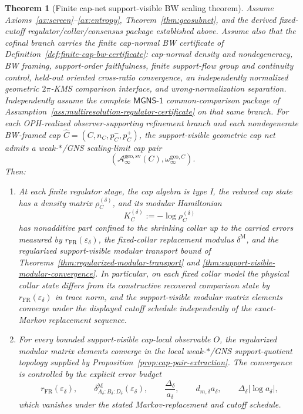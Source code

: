 \documentclass[11pt]{article}
\newtheorem{theorem}{Theorem}[section]
\begin{document}
\begin{theorem}[Finite cap-net support-visible BW scaling theorem]\label{thm:bw}
Assume Axioms~\ref{ax:screen}--\ref{ax:entropy}, Theorem~\ref{thm:geosubnet}, and the derived fixed-cutoff regulator/collar/consensus package established above. Assume also that the cofinal branch carries the finite cap-normal BW certificate of Definition~\ref{def:finite-cap-bw-certificate}: cap-normal density and nondegeneracy, BW framing, support-order faithfulness, finite support-flow group and continuity control, held-out oriented cross-ratio convergence, an independently normalized geometric \(2\pi\)-KMS comparison interface, and wrong-normalization separation. Independently assume the complete \(\mathsf{MGNS\text{-}1}\) common-comparison package of Assumption~\ref{ass:multiresolution-regulator-certificate} on that same branch. For each OPH-realized observer-supporting refinement branch and each nondegenerate BW-framed cap \(\widehat C=(C,n_C,p_C^-,p_C^+)\), the support-visible geometric cap net admits a weak-\(*\)/GNS scaling-limit cap pair
\[
(\mathcal A_\infty^{\mathrm{geo,sv}}(C),\omega_\infty^{\mathrm{geo},C}).
\]
Then:
\begin{enumerate}[label=\textup{(\roman*)},leftmargin=2em]
\item At each finite regulator stage, the cap algebra is type I, the reduced cap state has a density matrix \(\rho_C^{(\delta)}\), and its modular Hamiltonian
\[
K_C^{(\delta)}:=-\log \rho_C^{(\delta)}
\]
has nonadditive part confined to the shrinking collar up to the carried errors measured by \(r_{\mathrm{FR}}(\varepsilon_\delta)\), the fixed-collar replacement modulus \(\delta^{\mathrm M}\), and the regularized support-visible modular transport bound of Theorems~\ref{thm:regularized-modular-transport} and \ref{thm:support-visible-modular-convergence}. In particular, on each fixed collar model the physical collar state differs from its constructive recovered comparison state by \(r_{\mathrm{FR}}(\varepsilon_\delta)\) in trace norm, and the support-visible modular matrix elements converge under the displayed cutoff schedule independently of the exact-Markov replacement sequence.

\item For every bounded support-visible cap-local observable \(O\), the regularized modular
matrix elements converge in the local weak-\(*\)/GNS support-quotient topology supplied by
Proposition~\ref{prop:cap-pair-extraction}. The convergence is controlled by the explicit error
budget
\[
r_{\mathrm{FR}}(\varepsilon_\delta),\qquad
\delta^{\mathrm M}_{A_\delta:B_\delta:D_\delta}(\varepsilon_\delta),\qquad
\frac{\Delta_\delta}{a_\delta},\qquad
d_{m,\delta}a_\delta,\qquad
\Delta_\delta|\log a_\delta|,
\]
which vanishes under the stated Markov-replacement and cutoff schedule.


\end{enumerate}
\end{theorem}
\end{document}
